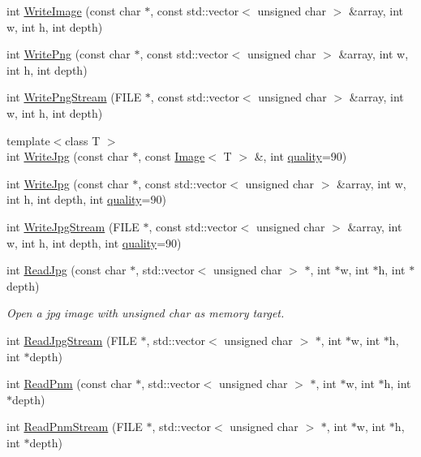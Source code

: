 \begin{DoxyCompactItemize}
\item 
int \hyperlink{namespacelibs_a87f8bfd0c303e88879ea628b4ac42a70}{Write\+Image} (const char $\ast$, const std\+::vector$<$ unsigned char $>$ \&array, int w, int h, int depth)
\item 
int \hyperlink{namespacelibs_a385c16aed3480c8a1924d9441e9e50f7}{Write\+Png} (const char $\ast$, const std\+::vector$<$ unsigned char $>$ \&array, int w, int h, int depth)
\item 
int \hyperlink{namespacelibs_ae001b8e0512de6a8fca9f7d413721ee2}{Write\+Png\+Stream} (F\+I\+L\+E $\ast$, const std\+::vector$<$ unsigned char $>$ \&array, int w, int h, int depth)
\item 
{\footnotesize template$<$class T $>$ }\\int \hyperlink{namespacelibs_a67277ddab96cb013be33e96ddb4b98ff}{Write\+Jpg} (const char $\ast$, const \hyperlink{classImage}{Image}$<$ T $>$ \&, int \hyperlink{jpeglib_8h_acac7df77df55f2a1bfd8d8d18340b773}{quality}=90)
\item 
int \hyperlink{namespacelibs_a7f21701cab9cc35c4375bf9c5ffc9908}{Write\+Jpg} (const char $\ast$, const std\+::vector$<$ unsigned char $>$ \&array, int w, int h, int depth, int \hyperlink{jpeglib_8h_acac7df77df55f2a1bfd8d8d18340b773}{quality}=90)
\item 
int \hyperlink{namespacelibs_ae4e6e197dfd59e7a07bd7ec66fc11752}{Write\+Jpg\+Stream} (F\+I\+L\+E $\ast$, const std\+::vector$<$ unsigned char $>$ \&array, int w, int h, int depth, int \hyperlink{jpeglib_8h_acac7df77df55f2a1bfd8d8d18340b773}{quality}=90)
\item 
int \hyperlink{namespacelibs_aee6a1b332895dd0ce936cfc1afb7824a}{Read\+Jpg} (const char $\ast$, std\+::vector$<$ unsigned char $>$ $\ast$, int $\ast$w, int $\ast$h, int $\ast$depth)
\begin{DoxyCompactList}\small\item\em Open a jpg image with unsigned char as memory target. \end{DoxyCompactList}\item 
int \hyperlink{namespacelibs_a12fde982bc6282e9a3d6a0b59cc6a2b1}{Read\+Jpg\+Stream} (F\+I\+L\+E $\ast$, std\+::vector$<$ unsigned char $>$ $\ast$, int $\ast$w, int $\ast$h, int $\ast$depth)
\item 
int \hyperlink{namespacelibs_aa50771ff6835e3b84083ae83625384f0}{Read\+Pnm} (const char $\ast$, std\+::vector$<$ unsigned char $>$ $\ast$, int $\ast$w, int $\ast$h, int $\ast$depth)
\item 
int \hyperlink{namespacelibs_a167607e1384098c7d08f1fe00413ecc7}{Read\+Pnm\+Stream} (F\+I\+L\+E $\ast$, std\+::vector$<$ unsigned char $>$ $\ast$, int $\ast$w, int $\ast$h, int $\ast$depth)

\end{DoxyCompactItemize}
